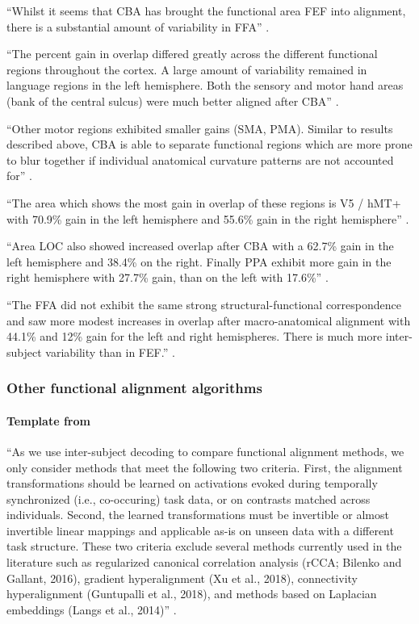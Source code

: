 ``Whilst it seems that CBA has brought the functional area FEF into alignment,
there is a substantial amount of variability in FFA''
\citep{frost2012measuring}.

``The percent gain in overlap differed greatly across the different functional
regions throughout the cortex.
%
A large amount of variability remained in language regions in the left
hemisphere.
%
Both the sensory and motor hand areas (bank of the central sulcus) were much
better aligned after CBA'' \citep{frost2012measuring}.

``Other motor regions exhibited smaller gains (SMA, PMA).
%
Similar to results described above, CBA is able to separate functional regions
which are more prone to blur together if individual anatomical curvature
patterns are not accounted for'' \citep{frost2012measuring}.

``The area which shows the most gain in overlap of these regions is V5 / hMT+
with 70.9\% gain in the left hemisphere and 55.6\% gain in the right
hemisphere'' \citep{frost2012measuring}.

``Area LOC also showed increased overlap after CBA with a 62.7\% gain in the
left hemisphere and 38.4\% on the right.
%
Finally PPA exhibit more gain in the right hemisphere with 27.7\% gain, than on
the left with 17.6\%'' \citep{frost2012measuring}.

``The FFA did not exhibit the same strong structural-functional correspondence
and saw more modest increases in overlap after macro-anatomical alignment with
44.1\% and 12\% gain for the left and right hemispheres.
%
There is much more inter-subject variability than in FEF.''
\citep{frost2012measuring}.



\subsubsection{Other functional alignment algorithms}




\paragraph{Template from \citet{bazeille2021empirical}}
%
``As we use inter-subject decoding to compare functional alignment methods, we
only consider methods that meet the following two criteria.
%
First, the alignment transformations should be learned on activations evoked
during temporally synchronized (i.e., co-occuring) task data, or on contrasts
matched across individuals.
%
Second, the learned transformations must be invertible or almost invertible
linear mappings and applicable as-is on unseen data with a different task
structure.
%
These two criteria exclude several methods currently used in the literature such
as regularized canonical correlation analysis (rCCA; Bilenko and Gallant, 2016),
gradient hyperalignment (Xu et al., 2018), connectivity hyperalignment
(Guntupalli et al., 2018), and methods based on Laplacian embeddings (Langs et
al., 2014)'' \citep{bazeille2021empirical}.

